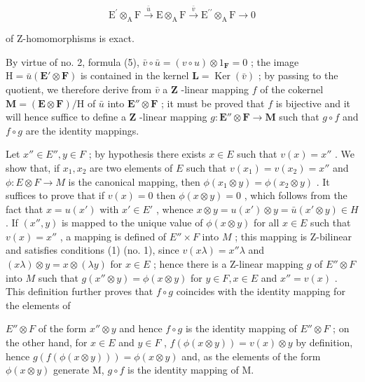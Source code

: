 \[
\mathrm{E} ^ {\prime} \otimes_ {\mathrm{A}} \mathrm{F} \xrightarrow {\bar {u}} \mathrm{E} \otimes_ {\mathrm{A}} \mathrm{F} \xrightarrow {\bar {v}} \mathrm{E} ^ {\prime \prime} \otimes_ {\mathrm{A}} \mathrm{F} \longrightarrow 0\tag{15}
\]

of Z-homomorphisms is exact.

By virtue of no. 2, formula (5), \(\bar{v} \circ \bar{u} = (v \circ u) \otimes 1_{\mathbf{F}} = 0\) ; the image \(\mathrm{H} = \bar{u} (\mathbf{E}' \otimes \mathbf{F})\) is contained in the kernel \(\mathbf{L} = \operatorname{Ker}(\bar{v})\) ; by passing to the quotient, we therefore derive from \(\bar{v}\) a \(\mathbf{Z}\) -linear mapping \(f\) of the cokernel \(\mathbf{M} = (\mathbf{E} \otimes \mathbf{F}) / \mathrm{H}\) of \(\bar{u}\) into \(\mathbf{E}'' \otimes \mathbf{F}\) ; it must be proved that \(f\) is bijective and it will hence suffice to define a \(\mathbf{Z}\) -linear mapping \(g: \mathbf{E}'' \otimes \mathbf{F} \to \mathbf{M}\) such that \(g \circ f\) and \(f \circ g\) are the identity mappings.

Let \(x'' \in E'', y \in F\) ; by hypothesis there exists \(x \in E\) such that \(v(x) = x''\) . We show that, if \(x_1, x_2\) are two elements of \(E\) such that \(v(x_1) = v(x_2) = x''\) and \(\phi: E \otimes F \to M\) is the canonical mapping, then \(\phi(x_1 \otimes y) = \phi(x_2 \otimes y)\) . It suffices to prove that if \(v(x) = 0\) then \(\phi(x \otimes y) = 0\) , which follows from the fact that \(x = u(x')\) with \(x' \in E'\) , whence \(x \otimes y = u(x') \otimes y = \bar{u}(x' \otimes y) \in H\) . If \((x'', y)\) is mapped to the unique value of \(\phi(x \otimes y)\) for all \(x \in E\) such that \(v(x) = x''\) , a mapping is defined of \(E'' \times F\) into \(M\) ; this mapping is Z-bilinear and satisfies conditions (1) (no. 1), since \(v(x\lambda) = x''\lambda\) and \((x\lambda) \otimes y = x \otimes (\lambda y)\) for \(x \in E\) ; hence there is a Z-linear mapping \(g\) of \(E'' \otimes F\) into \(M\) such that \(g(x'' \otimes y) = \phi(x \otimes y)\) for \(y \in F, x \in E\) and \(x'' = v(x)\) . This definition further proves that \(f \circ g\) coincides with the identity mapping for the elements of

\(E'' \otimes F\) of the form \(x'' \otimes y\) and hence \(f \circ g\) is the identity mapping of \(E'' \otimes F\) ; on the other hand, for \(x \in E\) and \(y \in F\) , \(f(\phi(x \otimes y)) = v(x) \otimes y\) by definition, hence \(g(f(\phi(x \otimes y))) = \phi(x \otimes y)\) and, as the elements of the form \(\phi(x \otimes y)\) generate M, \(g \circ f\) is the identity mapping of M.

